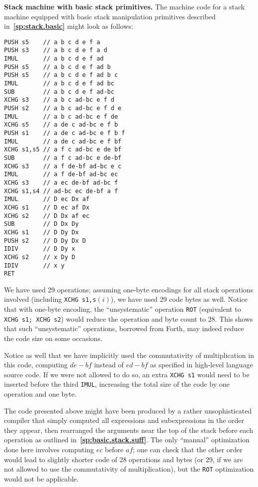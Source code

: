 \documentclass[12pt,oneside]{article}
\def\makepoint#1{\medbreak\noindent{\bf #1.\ }}
\def\nxsubpoint{\refstepcounter{subsubsection}%
  \smallbreak\makepoint{\thesubsubsection}}
\def\refpoint#1{{\rm\textbf{\ref{#1}}}}
\let\ptref=\refpoint
\def\emb#1{\textbf{#1.}}
\begin{document}
\nxsubpoint\label{sp:cmp1.stack.base}
\emb{Stack machine with basic stack primitives}
The machine code for a stack machine equipped with basic stack manipulation primitives described in~\ptref{sp:stack.basic} might look as follows:
\begin{verbatim}
PUSH s5    // a b c d e f a
PUSH s3    // a b c d e f a d
IMUL       // a b c d e f ad
PUSH s5    // a b c d e f ad b
PUSH s5    // a b c d e f ad b c
IMUL       // a b c d e f ad bc
SUB        // a b c d e f ad-bc
XCHG s3    // a b c ad-bc e f d
PUSH s2    // a b c ad-bc e f d e
IMUL       // a b c ad-bc e f de
XCHG s5    // a de c ad-bc e f b
PUSH s1    // a de c ad-bc e f b f
IMUL       // a de c ad-bc e f bf
XCHG s1,s5 // a f c ad-bc e de bf
SUB        // a f c ad-bc e de-bf
XCHG s3    // a f de-bf ad-bc e c
IMUL       // a f de-bf ad-bc ec
XCHG s3    // a ec de-bf ad-bc f
XCHG s1,s4 // ad-bc ec de-bf a f
IMUL       // D ec Dx af
XCHG s1    // D ec af Dx
XCHG s2    // D Dx af ec
SUB        // D Dx Dy
XCHG s1    // D Dy Dx
PUSH s2    // D Dy Dx D
IDIV       // D Dy x
XCHG s2    // x Dy D
IDIV       // x y
RET
\end{verbatim}
We have used 29 operations; assuming one-byte encodings for all stack operations involved (including \texttt{XCHG s1,s$(i)$}), we have used 29 code bytes as well. Notice that with one-byte encoding, the ``unsystematic'' operation \texttt{ROT} (equivalent to \texttt{XCHG s1; XCHG s2}) would reduce the operation and byte count to 28. This shows that such ``unsystematic'' operations, borrowed from Forth, may indeed reduce the code size on some occasions.

Notice as well that we have implicitly used the commutativity of multiplication in this code, computing $de-bf$ instead of $ed-bf$ as specified in high-level language source code. If we were not allowed to do so, an extra \texttt{XCHG s1} would need to be inserted before the third \texttt{IMUL}, increasing the total size of the code by one operation and one byte.

The code presented above might have been produced by a rather unsophisticated compiler that simply computed all expressions and subexpressions in the order they appear, then rearranged the arguments near the top of the stack before each operation as outlined in~\ptref{sp:basic.stack.suff}. The only ``manual'' optimization done here involves computing $ec$ before $af$; one can check that the other order would lead to slightly shorter code of 28 operations and bytes (or 29, if we are not allowed to use the commutativity of multiplication), but the \texttt{ROT} optimization would not be applicable.
\end{document}
